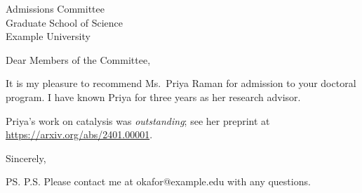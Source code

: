 \documentclass[11pt]{letter}
\date{March 3, 2024}
\begin{document}
\begin{letter}{Admissions Committee \\ Graduate School of Science \\ Example University}
\opening{Dear Members of the Committee,}

It is my pleasure to recommend Ms.~Priya Raman for admission to your doctoral program.
I have known Priya for three years as her research advisor.

Priya's work on catalysis was \emph{outstanding}; see her preprint at \url{https://arxiv.org/abs/2401.00001}.

\closing{Sincerely,}
\ps{P.S. Please contact me at okafor@example.edu with any questions.}
\end{letter}
\end{document}
